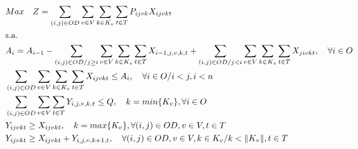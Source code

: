 \allowdisplaybreaks
\begin{align}
	 & Max \quad Z = \sum_{(i,j)\in OD} \sum_{v\in V} \sum_{k\in K_v} \sum_{t\in T} P_{ijvk} X_{ijvkt}                                                                                                                \label{eq: m1_fo}                                                             \\
	 & \text{s.a.}  \notag                                                                                                                                                                                                                                                                          \\
	 & A_{i} = A_{i-1} - \sum_{(i,j) \in OD/j \geq i} \sum_{v\in V} \sum_{k\in K_v}\sum_{t\in T}X_{i-1,j,v,k,t} + \sum_{(i,j) \in OD/j<i}\sum_{v\in V} \sum_{k\in K_v}\sum_{t\in T}X_{jivkt}, \quad \forall i \in O  \label{eq: m1_disponi}                                                         \\
	 & \sum_{(i,j) \in OD}\sum_{v\in V} \sum_{k\in K_v}\sum_{t\in T} X_{ijvkt} \leq A_{i} , \quad \forall i \in O /i<j, i < n                                                                                        \label{eq: m1_cap_assig}                                                       \\
	 & \sum_{(i,j) \in OD}\sum_{v\in V}\sum_{t\in T} Y_{i,j,v,k,t} \leq Q, \quad  k = min\{K_v\}, \forall i \in O                                                                                                    \label{eq: m1_cap_autho_1er_class}                                             \\
	 & Y_{ijvkt} \geq  X_{ijvkt},  \quad k = max\{K_v\}, \forall(i,j) \in OD ,v \in V, t \in T                                                                                                                       \label{eq: m1_autho_mayor_assig_1er_class}                                     \\
	 & Y_{ijvkt} \geq  X_{ijvkt} + Y_{i,j,v,k + 1,t} , \quad \forall(i,j) \in OD, v \in V, k \in K_v / k < \lVert K_v \rVert , t \in T                                                                               \label{eq: m1_autho_mayor_assig_mas_autho}                                     \\

\end{align}
